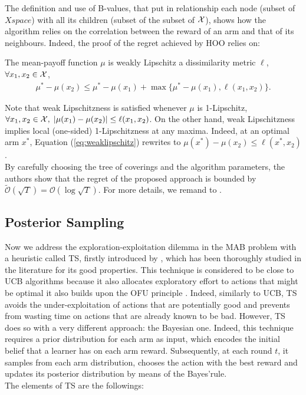 The definition and use of B-values, that put in relationship each node (subset of $Xspace$) with all its children (subset of the subset of $\mathcal{X}$), shows how the algorithm relies on the correlation between the reward of an arm and that of its neighbours. Indeed, the proof of the regret achieved by \gls{HOO} relies on:

\begin{assumption}
The mean-payoff function $\mu$ is weakly Lipschitz \wrt a dissimilarity metric $\ell$, \ie $\forall x_1,x_2\in\mathcal{X}$,
\begin{align}
\mu^*-\mu(x_2)\leq\mu^* - \mu(x_1)+\max\{\mu^* - \mu(x_1), \ell(x_1,x_2)\}. \label{eq:weaklipschitz}
\end{align}
\end{assumption}

Note that weak Lipschitzness is satisfied whenever $\mu$ is 1-Lipschitz, \ie $\forall x_1,x_2\in\mathcal{X}, \; |\mu(x_1)-\mu(x_2)|\leq\ell(x_1,x_2)$. On the other hand, weak Lipschitzness implies local (one-sided) 1-Lipschitzness at any maxima. Indeed, at an optimal arm $x^*$, Equation (\ref{eq:weaklipschitz}) rewrites to $\mu(x^*)-\mu(x_2)\leq\ell(x^*,x_2)$. \\
By carefully choosing the tree of coverings and the algorithm parameters, the authors show that the regret of the proposed approach is bounded by $\widetilde{\mathcal{O}}(\sqrt{T}) = \mathcal{O}(\log\sqrt{T})$. For more details, we remand to \cite{bubeck2011x}.


\subsection{Posterior Sampling}
Now we address the exploration-exploitation dilemma in the \gls{MAB} problem with a heuristic called \gls{TS}, firstly introduced by \cite{thompson1933likelihood}, which has been thoroughly studied in the literature for its good properties. This technique is considered to be close to \gls{UCB} algorithms because it also allocates exploratory effort to actions that might be optimal \ie it also builds upon the \gls{OFU} principle \cite{russo2013eluder}. Indeed, similarly to \gls{UCB}, \gls{TS} avoids the under-exploitation of actions that are potentially good and prevents from wasting time on actions that are already known to be bad. However, \gls{TS} does so with a very different approach: the Bayesian one. Indeed, this technique requires a prior distribution for each arm as input, which encodes the initial belief that a learner has on each arm reward. Subsequently, at each round $t$, it samples from each arm distribution, chooses the action with the best reward and updates its posterior distribution by means of the Bayes'rule.\\ The elements of \gls{TS} are the followings:

